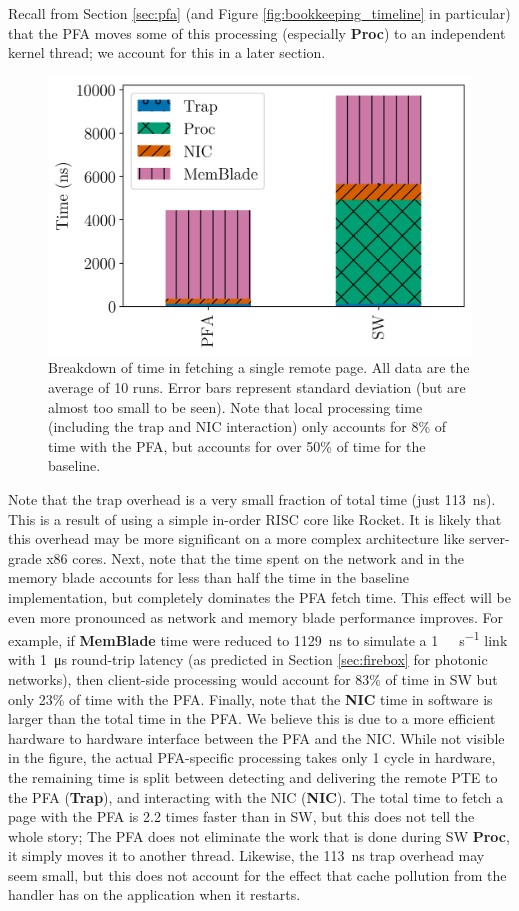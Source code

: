   Recall from Section \ref{sec:pfa} (and Figure \ref{fig:bookkeeping_timeline}
  in particular) that the PFA moves some of this processing (especially
  \textbf{Proc}) to an independent kernel thread; we account for this in a
  later section. 

  \begin{figure}[h] \centering
    \includegraphics[width=0.6\columnwidth]{figs/fetch_breakdown.png}
    \vspace{-5mm}
    \caption{Breakdown of time in fetching a single remote page. All data are 
    the average of 10 runs. Error bars represent standard deviation (but are
  almost too small to be seen). Note that local processing time (including
  the trap and NIC interaction) only accounts for 8\% of time with the PFA, but
  accounts for over 50\% of time for the baseline.}
    \label{fig:fetch_breakdown}
  \end{figure}

  Note that the trap overhead is a very small fraction of total time (just
  \SI{113}{\nano\second}). This is a result of using a simple in-order RISC
  core like Rocket. It is likely that this overhead may be more significant on
  a more complex architecture like server-grade x86 cores. Next, note that the
  time spent on the network and in the memory blade accounts for less than half
  the time in the baseline implementation, but completely dominates the PFA
  fetch time. This effect will be even more pronounced as network and memory
  blade performance improves. For example, if \textbf{MemBlade} time were
  reduced to \SI{1129}{\nano\second} to simulate a \SI{1}{\tera\bit\per\second}
  link with \SI{1}{\micro\second} round-trip latency (as predicted in Section
  \ref{sec:firebox} for photonic networks), then client-side processing would
  account for 83\% of time in SW but only 23\% of time with the PFA. Finally,
  note that the \textbf{NIC} time in software is larger than the total time in
  the PFA. We believe this is due to a more efficient hardware to hardware
  interface between the PFA and the NIC. While not visible in the figure, the
  actual PFA-specific processing takes only 1 cycle in hardware, the remaining
  time is split between detecting and delivering the remote PTE to the PFA
  (\textbf{Trap}), and interacting with the NIC (\textbf{NIC}). The total time
  to fetch a page with the PFA is 2.2 times faster than in SW, but this does
  not tell the whole story; The PFA does not eliminate the work that is done
  during SW \textbf{Proc}, it simply moves it to another thread. Likewise, the
  \SI{113}{\nano\second} trap overhead may seem small, but this does not
  account for the effect that cache pollution from the handler has on the
  application when it restarts.

